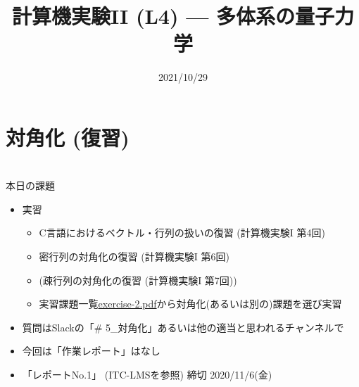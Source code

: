 \documentclass[10pt,dvipdfmx]{beamer}
\title{計算機実験II (L4) --- 多体系の量子力学}
\date{2021/10/29}
\begin{document}
\begin{frame}
  \titlepage
  \tableofcontents
\end{frame}



\section{対角化 (復習)}






\section{}
\begin{frame}[t]{本日の課題}
  \begin{itemize}
  \item 実習
    \begin{itemize}
    \item C言語におけるベクトル・行列の扱いの復習 (計算機実験I 第4回)
    \item 密行列の対角化の復習 (計算機実験I 第6回)
    \item (疎行列の対角化の復習 (計算機実験I 第7回))
    \item 実習課題一覧\href{https://github.com/todo-group/ComputerExperiments/releases/tag/2020a-computer2}{exercise-2.pdf}から対角化(あるいは別の)課題を選び実習
    \end{itemize}
  \item 質問はSlackの「\# 5\_対角化」あるいは他の適当と思われるチャンネルで
  \item 今回は「作業レポート」はなし
  \item 「レポートNo.1」 (ITC-LMSを参照) 締切 2020/11/6(金)
  \end{itemize}
\end{frame}
\end{document}
